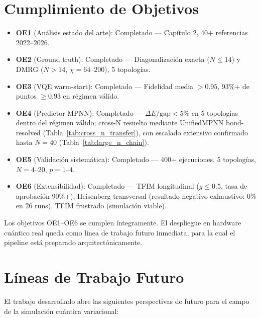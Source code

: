 \documentclass[11pt,a4paper,spanish]{book}
\begin{document}
\section{Cumplimiento de Objetivos}

\begin{itemize}
    \item \textbf{OE1} (Análisis estado del arte): Completado --- Capítulo 2, 40+ referencias 2022--2026.
    \item \textbf{OE2} (Ground truth): Completado --- Diagonalización exacta ($N \leq 14$) y DMRG ($N > 14$, $\chi = 64$--$200$), 5 topologías.
    \item \textbf{OE3} (VQE warm-start): Completado --- Fidelidad media $> 0.95$, 93\%+ de puntos $\geq 0.93$ en régimen válido.
    \item \textbf{OE4} (Predictor MPNN): Completado --- $\Delta E/\text{gap} < 5\%$ en 5 topologías dentro del régimen válido; cross-N resuelto mediante UnifiedMPNN bond-resolved (Tabla~\ref{tab:cross_n_transfer}), con escalado extensivo confirmado hasta $N = 40$ (Tabla~\ref{tab:large_n_chain}).
    \item \textbf{OE5} (Validación sistemática): Completado --- 400+ ejecuciones, 5 topologías, $N = 4$--$20$, $p = 1$--$4$.
    \item \textbf{OE6} (Extensibilidad): Completado --- TFIM longitudinal ($g \leq 0.5$, tasa de aprobación 90\%+), Heisenberg transversal (resultado negativo exhaustivo: 0\% en 26 runs), TFIM frustrado (simulación viable).
\end{itemize}

Los objetivos OE1--OE6 se cumplen íntegramente. El despliegue en hardware cuántico real queda como línea de trabajo futuro inmediata, para la cual el pipeline está preparado arquitectónicamente.

\section{Líneas de Trabajo Futuro}

El trabajo desarrollado abre las siguientes perspectivas de futuro para el campo de la simulación cuántica variacional:
\end{document}
